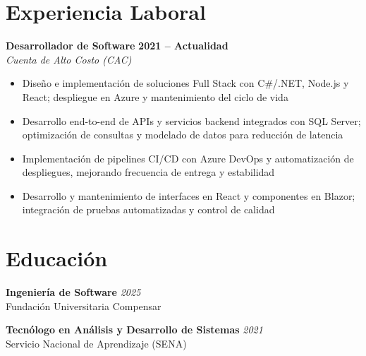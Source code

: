 \documentclass[11pt,a4paper]{article}
\begin{document}
\section{Experiencia Laboral}

\textbf{Desarrollador de Software} \hfill \textbf{2021 -- Actualidad} \\
\textit{Cuenta de Alto Costo (CAC)}
\begin{itemize}[noitemsep, topsep=0pt]
    \item Diseño e implementación de soluciones Full Stack con C\#/.NET, Node.js y React; despliegue en Azure y mantenimiento del ciclo de vida
    \item Desarrollo end-to-end de APIs y servicios backend integrados con SQL Server; optimización de consultas y modelado de datos para reducción de latencia 
    \item Implementación de pipelines CI/CD con Azure DevOps y automatización de despliegues, mejorando frecuencia de entrega y estabilidad 
    \item Desarrollo y mantenimiento de interfaces en React y componentes en Blazor; integración de pruebas automatizadas y control de calidad
\end{itemize}


\section{Educación}

\textbf{Ingeniería de Software} \hfill \textit{2025} \\
Fundación Universitaria Compensar

\vspace{1pt}

\textbf{Tecnólogo en Análisis y Desarrollo de Sistemas} \hfill \textit{2021} \\
Servicio Nacional de Aprendizaje (SENA)

\end{document}
